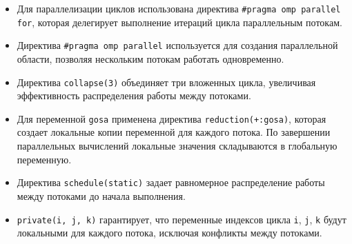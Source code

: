 \documentclass[a4paper, 11pt]{article}
\begin{document}
\begin{itemize}
    \item Для параллелизации циклов использована директива \texttt{\#pragma omp parallel for}, которая делегирует выполнение итераций цикла параллельным потокам.
    \item Директива \texttt{\#pragma omp parallel} используется для создания параллельной области, позволяя нескольким потокам работать одновременно.
    \item Директива \texttt{collapse(3)} объединяет три вложенных цикла, увеличивая эффективность распределения работы между потоками.
    \item Для переменной \texttt{gosa} применена директива \texttt{reduction(+:gosa)}, которая создает локальные копии переменной для каждого потока. По завершении параллельных вычислений локальные значения складываются в глобальную переменную.
    \item Директива \texttt{schedule(static)} задает равномерное распределение работы между потоками до начала выполнения.
    \item \texttt{private(i, j, k)} гарантирует, что переменные индексов цикла \texttt{i}, \texttt{j}, \texttt{k} будут локальными для каждого потока, исключая конфликты между потоками.
\end{itemize}
\newpage
\end{document}
